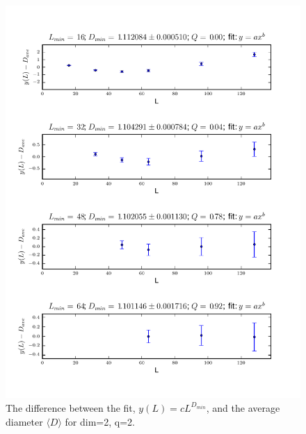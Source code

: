 \documentclass[pre,preprint]{revtex4}
\newcommand{\lb}{{\langle}}
\newcommand{\rb}{{\rangle}}
\begin{document}
\begin{figure}[htp]
\centering
\includegraphics[width=.85\textwidth]{figures/D_min_D2q2_46_fig}
\caption{The difference between the fit, $y(L)=cL^{D_{min}}$, and the average diameter $\lb D \rb$ for dim=2, q=2.}\label{fig:4}
\end{figure}

\end{document}
